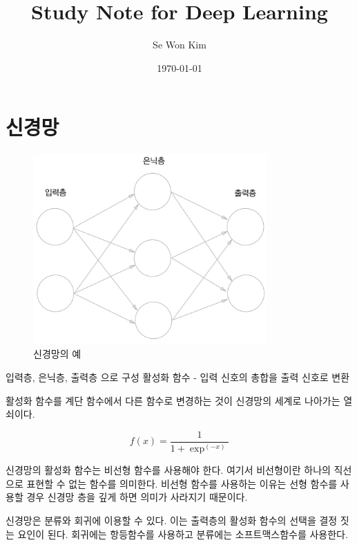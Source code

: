 \documentclass[12pt]{article}
\title{Study Note for Deep Learning}
\author{Se Won Kim}
\date{\today}
\begin{document}
	\maketitle
	
	\tableofcontents
	

	
	
	
	

	\clearpage
	\section{신경망}
	
	\begin{figure}[!h] %
		\centering
		\includegraphics[width=0.8\textwidth]{fig/fig-3-1.png}
		\caption{신경망의 예}
	\end{figure}
	
	
	입력층, 은닉층, 출력층 으로 구성
	활성화 함수 - 입력 신호의 총합을 출력 신호로 변환
	
	활성화 함수를 계단 함수에서 다른 함수로 변경하는 것이 신경망의 세계로 나아가는 열쇠이다.
	
	\[ f(x)=\frac{1}{1+\exp^(-x)}	\]
	
	신경망의 활성화 함수는 비선형 함수를 사용해야 한다. 여기서 비선형이란 하나의 직선으로 표현할 수 없는 함수를 의미한다.
	비선형 함수를 사용하는 이유는 선형 함수를 사용할 경우 신경망 층을 깊게 하면 의미가 사라지기 때문이다.
	
	신경망은 분류와 회귀에 이용할 수 있다. 이는 출력층의 활성화 함수의 선택을 결정 짓는 요인이 된다. 회귀에는 항등함수를 사용하고 분류에는 소프트맥스함수를 사용한다.
	
\end{document}
